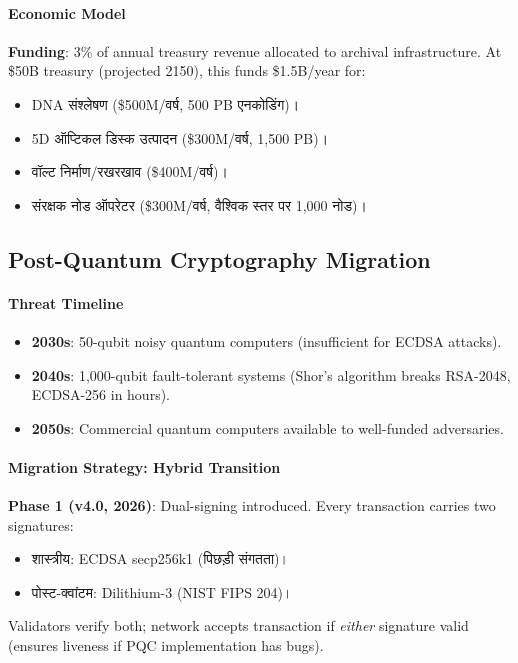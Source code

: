 \documentclass[11pt]{article}
\begin{document}
\begin{itemize}[noitemsep]
\begin{itemize}[noitemsep]
\paragraph{Economic Model}
\textbf{Funding}: 3\% of annual treasury revenue allocated to archival infrastructure. At \$50B treasury (projected 2150), this funds \$1.5B/year for:
\begin{itemize}[noitemsep]
  \item DNA संश्लेषण (\$500M/वर्ष, 500 PB एनकोडिंग)।
  \item 5D ऑप्टिकल डिस्क उत्पादन (\$300M/वर्ष, 1,500 PB)।
  \item वॉल्ट निर्माण/रखरखाव (\$400M/वर्ष)।
  \item संरक्षक नोड ऑपरेटर (\$300M/वर्ष, वैश्विक स्तर पर 1,000 नोड)।
\end{itemize}

\subsection{Post-Quantum Cryptography Migration}

\paragraph{Threat Timeline}
\begin{itemize}[noitemsep]
  \item \textbf{2030s}: 50-qubit noisy quantum computers (insufficient for ECDSA attacks).
  \item \textbf{2040s}: 1,000-qubit fault-tolerant systems (Shor's algorithm breaks RSA-2048, ECDSA-256 in hours).
  \item \textbf{2050s}: Commercial quantum computers available to well-funded adversaries.
\end{itemize}

\paragraph{Migration Strategy: Hybrid Transition}
\textbf{Phase 1 (v4.0, 2026)}: Dual-signing introduced. Every transaction carries two signatures:
\begin{itemize}[noitemsep]
  \item शास्त्रीय: ECDSA secp256k1 (पिछड़ी संगतता)।
  \item पोस्ट-क्वांटम: Dilithium-3 (NIST FIPS 204)।
\end{itemize}
Validators verify both; network accepts transaction if \emph{either} signature valid (ensures liveness if PQC implementation has bugs).


\end{itemize}
\end{itemize}
\end{document}
